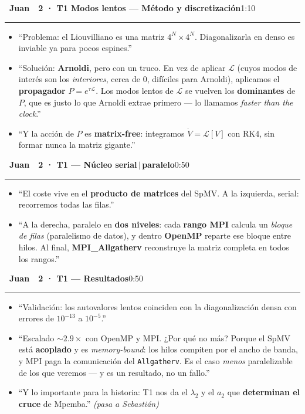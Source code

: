 \documentclass[11pt,a4paper]{article}
\newcommand{\Jb}{\colorbox{juan}{\color{white}\bfseries\footnotesize~Juan~}}
\newcommand{\cs}[1]{\textcolor{seb}{\textbf{#1}}}
\newcommand{\blk}[3]{%
  \par\medskip\noindent #1\ \textbf{#2}\hfill\textcolor{soft}{\small #3}\par
  \vspace{-4pt}\textcolor{soft!40}{\rule{\linewidth}{0.4pt}}\par\vspace{-2pt}}
\begin{document}
\blk{\Jb}{2 · T1 Modos lentos --- Método y discretización}{1:10}
\begin{itemize}
  \item ``Problema: el Liouvilliano es una matriz $4^N\times4^N$. Diagonalizarla en
    denso es inviable ya para pocos espines.''
  \item ``Solución: \textbf{Arnoldi}, pero con un truco. En vez de aplicar $\mathcal{L}$
    (cuyos modos de interés son los \emph{interiores}, cerca de 0, difíciles para
    Arnoldi), aplicamos el \textbf{propagador} $P=e^{\tau\mathcal{L}}$. Los modos lentos
    de $\mathcal{L}$ se vuelven los \textbf{dominantes} de $P$, que es justo lo que
    Arnoldi extrae primero --- lo llamamos \emph{faster than the clock}.''
  \item ``Y la acción de $P$ es \textbf{matrix-free}: integramos $\dot V=\mathcal{L}[V]$
    con RK4, sin formar nunca la matriz gigante.''
\end{itemize}

\blk{\Jb}{2 · T1 --- Núcleo serial\,$\vert$\,paralelo}{0:50}
\begin{itemize}
  \item ``El coste vive en el \textbf{producto de matrices} del SpMV. A la izquierda,
    serial: recorremos todas las filas.''
  \item ``A la derecha, paralelo en \textbf{dos niveles}: cada \textbf{rango MPI}
    calcula un \emph{bloque de filas} (paralelismo de datos), y dentro \textbf{OpenMP}
    reparte ese bloque entre hilos. Al final, \cs{MPI\_Allgatherv} reconstruye la
    matriz completa en todos los rangos.''
\end{itemize}

\blk{\Jb}{2 · T1 --- Resultados}{0:50}
\begin{itemize}
  \item ``Validación: los autovalores lentos coinciden con la diagonalización densa
    con errores de $10^{-13}$ a $10^{-5}$.''
  \item ``Escalado $\sim2.9\times$ con OpenMP y MPI. ¿Por qué no más? Porque el SpMV
    está \textbf{acoplado} y es \emph{memory-bound}: los hilos compiten por el ancho de
    banda, y MPI paga la comunicación del \texttt{Allgatherv}. Es el caso \emph{menos}
    paralelizable de los que veremos --- y es un resultado, no un fallo.''
  \item ``Y lo importante para la historia: T1 nos da el $\lambda_2$ y el $a_2$ que
    \textbf{determinan el cruce} de Mpemba.'' \emph{(pasa a Sebastián)}
\end{itemize}
\end{document}
